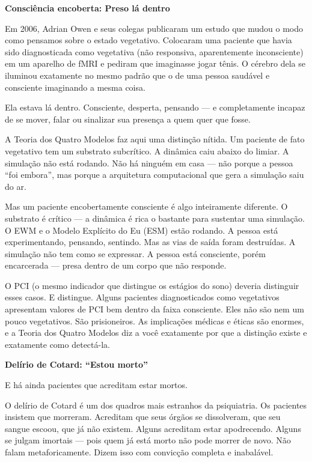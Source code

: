 \documentclass[11pt, twoside, openright]{book}
\begin{document}
\textbf{Consciência encoberta: Preso lá dentro}

Em 2006, Adrian Owen e seus colegas publicaram um estudo que mudou o modo como pensamos sobre o estado vegetativo. Colocaram uma paciente que havia sido diagnosticada como vegetativa (não responsiva, aparentemente inconsciente) em um aparelho de fMRI e pediram que imaginasse jogar tênis. O cérebro dela se iluminou exatamente no mesmo padrão que o de uma pessoa saudável e consciente imaginando a mesma coisa.

Ela estava lá dentro. Consciente, desperta, pensando --- e completamente incapaz de se mover, falar ou sinalizar sua presença a quem quer que fosse.

A Teoria dos Quatro Modelos faz aqui uma distinção nítida. Um paciente de fato vegetativo tem um substrato subcrítico. A dinâmica caiu abaixo do limiar. A simulação não está rodando. Não há ninguém em casa --- não porque a pessoa ``foi embora'', mas porque a arquitetura computacional que gera a simulação saiu do ar.

Mas um paciente encobertamente consciente é algo inteiramente diferente. O substrato é crítico --- a dinâmica é rica o bastante para sustentar uma simulação. O EWM e o Modelo Explícito do Eu (ESM) estão rodando. A pessoa está experimentando, pensando, sentindo. Mas as vias de saída foram destruídas. A simulação não tem como se expressar. A pessoa está consciente, porém encarcerada --- presa dentro de um corpo que não responde.

O PCI (o mesmo indicador que distingue os estágios do sono) deveria distinguir esses casos. E distingue. Alguns pacientes diagnosticados como vegetativos apresentam valores de PCI bem dentro da faixa consciente. Eles não são nem um pouco vegetativos. São prisioneiros. As implicações médicas e éticas são enormes, e a Teoria dos Quatro Modelos diz a você exatamente por que a distinção existe e exatamente como detectá-la.

\textbf{Delírio de Cotard: ``Estou morto''}

E há ainda pacientes que acreditam estar mortos.

O delírio de Cotard é um dos quadros mais estranhos da psiquiatria. Os pacientes insistem que morreram. Acreditam que seus órgãos se dissolveram, que seu sangue escoou, que já não existem. Alguns acreditam estar apodrecendo. Alguns se julgam imortais --- pois quem já está morto não pode morrer de novo. Não falam metaforicamente. Dizem isso com convicção completa e inabalável.
\end{document}
